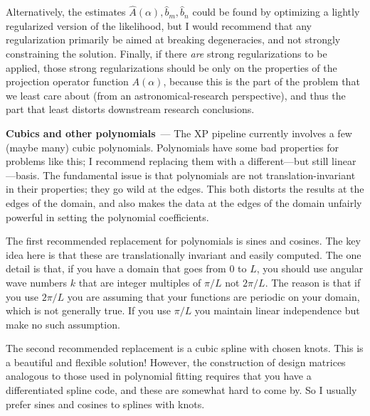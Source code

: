 \documentclass[11pt]{article}
\renewcommand{\paragraph}[1]{\medskip\par\noindent\textbf{#1}~---}
\begin{document}
Alternatively, the estimates $\hat{A}(\alpha), \hat{b}_m, \hat{b}_n$ could be found by optimizing a lightly regularized version of the likelihood, but I would recommend that any regularization primarily be aimed at breaking degeneracies, and not strongly constraining the solution.
Finally, if there \emph{are} strong regularizations to be applied, those strong regularizations should be only on the properties of the projection operator function $A(\alpha)$, because this is the part of the problem that we least care about (from an astronomical-research perspective), and thus the part that least distorts downstream research conclusions.

\paragraph{Cubics and other polynomials}
The XP pipeline currently involves a few (maybe many) cubic polynomials.
Polynomials have some bad properties for problems like this; I recommend replacing them with a different---but still linear---basis.
The fundamental issue is that polynomials are not translation-invariant in their properties; they go wild at the edges.
This both distorts the results at the edges of the domain, and also makes the data at the edges of the domain unfairly powerful in setting the polynomial coefficients.

The first recommended replacement for polynomials is sines and cosines.
The key idea here is that these are translationally invariant and easily computed.
The one detail is that, if you have a domain that goes from $0$ to $L$, you should use angular wave numbers $k$ that are integer multiples of $\pi/L$ not $2\pi/L$.
The reason is that if you use $2\pi/L$ you are assuming that your functions are periodic on your domain, which is not generally true.
If you use $\pi/L$ you maintain linear independence but make no such assumption.

The second recommended replacement is a cubic spline with chosen knots.
This is a beautiful and flexible solution!
However, the construction of design matrices analogous to those used in polynomial fitting requires that you have a differentiated spline code, and these are somewhat hard to come by.
So I usually prefer sines and cosines to splines with knots.
\end{document}
